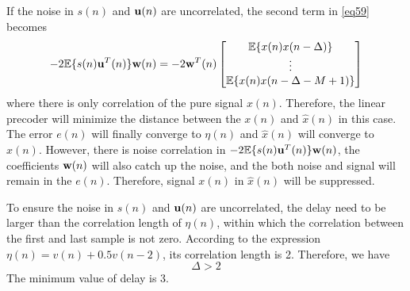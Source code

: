 \documentclass[10pt]{article}
\begin{document}
If the noise in $s(n)$ and ${\bf{u}}(n)$ are uncorrelated, the second term in \eqref{eq59} becomes
\begin{equation}
	- 2\mathbb{E}\{ s(n) {\bf{u}}^T(n) \} {\bf{w}}(n) = -2{\bf{w}}^T(n) \left[ 
		 \begin{matrix}
			 \mathbb{E}\{ x(n) x(n-\Delta) \}\\
			 \vdots\\
			 \mathbb{E}\{ x(n) x(n-\Delta-M+1) \}
		 \end{matrix}
	\right]
\end{equation}
where there is only correlation of the pure signal $x(n)$. Therefore, the linear precoder will minimize the distance 
between the $x(n)$ and $\hat{x}(n)$ in this case. The error $e(n)$ will finally converge to $\eta(n)$ and $\hat{x}(n)$ will converge to
$x(n)$. However, there is noise correlation in $- 2\mathbb{E}\{ s(n) {\bf{u}}^T(n) \} {\bf{w}}(n)$, the coefficients ${\bf{w}}(n)$ will also catch up the
noise, and the both noise and signal will remain in the $e(n)$. Therefore, signal $x(n)$ in $\hat{x}(n)$ will be suppressed.

To ensure the noise in $s(n)$ and ${\bf{u}}(n)$ are uncorrelated, the delay need to be larger than the correlation length of $\eta(n)$,  within which the correlation between the
first and last sample is not zero. According to the expression $\eta(n) = v(n) + 0.5v(n-2)$, its correlation length is 2.
Therefore, we have
\begin{equation}
	\Delta > 2
\end{equation}
The minimum value of delay is 3.
\end{document}
